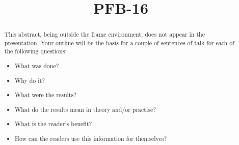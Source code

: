 \documentclass[ignorenonframetext,12pt]{beamer}
\title{PFB-16}
\begin{document}

\begin{abstract}
				This abstract, being outside the frame environment, does not appear in the presentation.  Your outline will be the basis for a couple of sentences of talk for each of the following questions:
				\begin{itemize}
								\item What was done?
								\item Why do it?
								\item What were the results?
								\item What do the results mean in theory and/or practise?
								\item What is the reader's benefit?
								\item How can the readers use this information for themselves? 
				\end{itemize}
\end{abstract}


\end{document}
